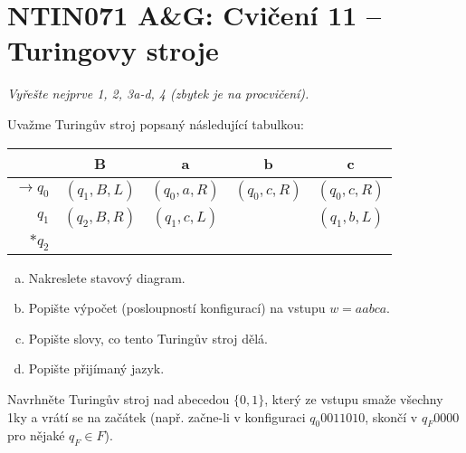 \documentclass[a4paper,12pt]{amsart}
\begin{document}
\thispagestyle{empty}

\section*{NTIN071 A\&G: Cvičení 11 -- Turingovy stroje}


\medskip

\noindent\emph{Vyřešte nejprve 1, 2, 3a-d, 4 (zbytek je na procvičení).}

\medskip


\medskip\begin{problem}
    
    Uvažme Turingův stroj popsaný následující tabulkou:
    
    \begin{table}[h]
    \begin{tabular}{r|cccc}
    & B   & a    & b    &  c  \\ \hline
    $\to q_0$ & $(q_1, B, L)$ & $(q_0, a, R)$ & $(q_0, c, R)$ & $(q_0, c, R)$ \\
    $q_1$ & $(q_2, B, R)$ & $(q_1, c, L)$ &  & $(q_1, b, L)$ \\
    $\ast q_2$  &              &              &              &             
    \end{tabular}
    \end{table}
    
    \begin{enumerate}[(a)]
        \item Nakreslete stavový diagram.
        \item Popište výpočet (posloupností konfigurací) na vstupu $w=aabca$.
        \item Popište slovy, co tento Turingův stroj dělá.
        \item Popište přijímaný jazyk.
    \end{enumerate}

\end{problem}
    
    
\medskip\begin{problem}

    Navrhněte Turingův stroj nad abecedou $\{0,1\}$, který ze vstupu smaže všechny 1ky a vrátí se na začátek (např. začne-li v konfiguraci $q_0 0011010$, skončí v $q_F 0000$ pro nějaké $q_F\in F$).

\end{problem}
    
\end{document}
